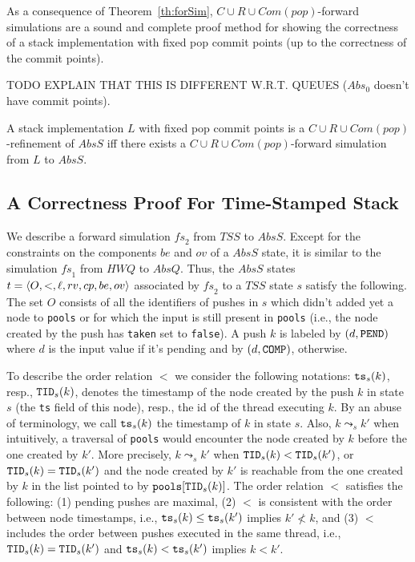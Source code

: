 
As a consequence of Theorem~\ref{th:forSim}, $C\cup R\cup Com(pop)$-forward simulations are a sound and complete proof method for showing the correctness of a stack implementation with fixed pop commit points (up to the correctness of the commit points). 

TODO EXPLAIN THAT THIS IS DIFFERENT W.R.T. QUEUES ($Abs_0$ doesn't have commit points).

\begin{corollary}
A stack implementation $L$ with fixed pop commit points is a $C\cup R\cup Com(pop)$-refinement of $AbsS$ if{f} there exists a $C\cup R\cup Com(pop)$-forward simulation from $L$ to $AbsS$.
\end{corollary}


\subsection{A Correctness Proof For Time-Stamped Stack}

We describe a forward simulation $\mathit{fs}_2$ from $\mathit{TSS}$ to $AbsS$. Except for the constraints on the components $be$ and $ov$ of a $AbsS$ state, it is similar to the simulation $\mathit{fs}_1$ from $\mathit{HWQ}$ to $AbsQ$. Thus, the $AbsS$ states $t=\langle {O,<,\ell,rv,cp,be,ov} \rangle$ associated by $\mathit{fs}_2$ to a $\mathit{TSS}$ state $s$ satisfy the following. The set $O$ consists of all the identifiers of pushes in $s$ which didn't added yet a node to {\tt pools} or for which the input is still present in {\tt pools} (i.e., the node created by the push has {\tt taken} set to {\tt false}). A push $k$ is labeled by $(d,{\tt PEND})$ where $d$ is the input value if it's pending and by $(d,{\tt COMP})$, otherwise. 

To describe the order relation $<$ we consider the following notations: ${\tt ts}_s(k)$, resp., ${\tt TID}_s(k)$, denotes the timestamp of the node created by the push $k$ in state $s$ (the {\tt ts} field of this node), resp., the id of the thread executing $k$. By an abuse of terminology, we call ${\tt ts}_s(k)$ the timestamp of $k$ in state $s$.
Also, $k \leadsto_s k'$ when intuitively, a traversal of {\tt pools}  would encounter the node created by $k$ before the one created by $k'$. More precisely, $k \leadsto_s k'$ when ${\tt TID}_s(k) < {\tt TID}_s(k')$, or ${\tt TID}_s(k) = {\tt TID}_s(k')$ and the node created by $k'$ is reachable from the one created by $k$ in the list pointed to by ${\tt pools}[{\tt TID}_s(k)]$.
The order relation $<$ satisfies the following: (1) pending pushes are maximal, (2) $<$ is consistent with the order between node timestamps, i.e., ${\tt ts}_s(k) \leq {\tt ts}_s(k')$ implies $k'\not< k$, and (3) $<$ includes the order between pushes executed in the same thread, i.e., ${\tt TID}_s(k) = {\tt TID}_s(k')$ and ${\tt ts}_s(k) < {\tt ts}_s(k')$ implies $k < k'$.

